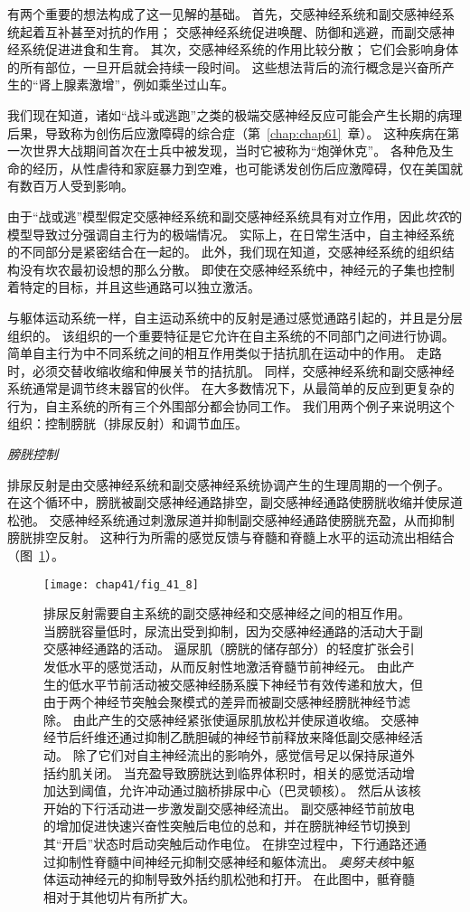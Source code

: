 有两个重要的想法构成了这一见解的基础。
首先，交感神经系统和副交感神经系统起着互补甚至对抗的作用；
交感神经系统促进唤醒、防御和逃避，而副交感神经系统促进进食和生育。
其次，交感神经系统的作用比较分散；
它们会影响身体的所有部位，一旦开启就会持续一段时间。
这些想法背后的流行概念是兴奋所产生的“肾上腺素激增”，例如乘坐过山车。


我们现在知道，诸如“战斗或逃跑”之类的极端交感神经反应可能会产生长期的病理后果，导致称为创伤后应激障碍的综合症（第~\ref{chap:chap61}~章）。
这种疾病在第一次世界大战期间首次在士兵中被发现，当时它被称为“炮弹休克”。
各种危及生命的经历，从性虐待和家庭暴力到空难，也可能诱发创伤后应激障碍，仅在美国就有数百万人受到影响。


由于“战或逃”模型假定交感神经系统和副交感神经系统具有对立作用，因此\textit{坎农}的模型导致过分强调自主行为的极端情况。
实际上，在日常生活中，自主神经系统的不同部分是紧密结合在一起的。
此外，我们现在知道，交感神经系统的组织结构没有坎农最初设想的那么分散。
即使在交感神经系统中，神经元的子集也控制着特定的目标，并且这些通路可以独立激活。


与躯体运动系统一样，自主运动系统中的反射是通过感觉通路引起的，并且是分层组织的。
该组织的一个重要特征是它允许在自主系统的不同部门之间进行协调。
简单自主行为中不同系统之间的相互作用类似于拮抗肌在运动中的作用。
走路时，必须交替收缩收缩和伸展关节的拮抗肌。
同样，交感神经系统和副交感神经系统通常是调节终末器官的伙伴。
在大多数情况下，从最简单的反应到更复杂的行为，自主系统的所有三个外围部分都会协同工作。
我们用两个例子来说明这个组织：控制膀胱（排尿反射）和调节血压。


\textit{膀胱控制}

排尿反射是由交感神经系统和副交感神经系统协调产生的生理周期的一个例子。
在这个循环中，膀胱被副交感神经通路排空，副交感神经通路使膀胱收缩并使尿道松弛。
交感神经系统通过刺激尿道并抑制副交感神经通路使膀胱充盈，从而抑制膀胱排空反射。
这种行为所需的感觉反馈与脊髓和脊髓上水平的运动流出相结合（图~\ref{fig:41_8}）。


\begin{figure}[htbp]
	\centering
	\texttt{[image: chap41/fig\_41\_8]}
	\caption{排尿反射需要自主系统的副交感神经和交感神经之间的相互作用\cite{de1993neurophysiology}。
		当膀胱容量低时，尿流出受到抑制，因为交感神经通路的活动大于副交感神经通路的活动。
		逼尿肌（膀胱的储存部分）的轻度扩张会引发低水平的感觉活动，从而反射性地激活脊髓节前神经元。
		由此产生的低水平节前活动被交感神经肠系膜下神经节有效传递和放大，但由于两个神经节突触会聚模式的差异而被副交感神经膀胱神经节滤除。
		由此产生的交感神经紧张使逼尿肌放松并使尿道收缩。
		交感神经节后纤维还通过抑制乙酰胆碱的神经节前释放来降低副交感神经活动。
		除了它们对自主神经流出的影响外，感觉信号足以保持尿道外括约肌关闭。
		当充盈导致膀胱达到临界体积时，相关的感觉活动增加达到阈值，允许冲动通过脑桥排尿中心（巴灵顿核）。
		然后从该核开始的下行活动进一步激发副交感神经流出。
		副交感神经节前放电的增加促进快速兴奋性突触后电位的总和，并在膀胱神经节切换到其“开启”状态时启动突触后动作电位。
		在排空过程中，下行通路还通过抑制性脊髓中间神经元抑制交感神经和躯体流出。
		\textit{奥努夫核}中躯体运动神经元的抑制导致外括约肌松弛和打开。
		在此图中，骶脊髓相对于其他切片有所扩大。}
	\label{fig:41_8}
\end{figure}


